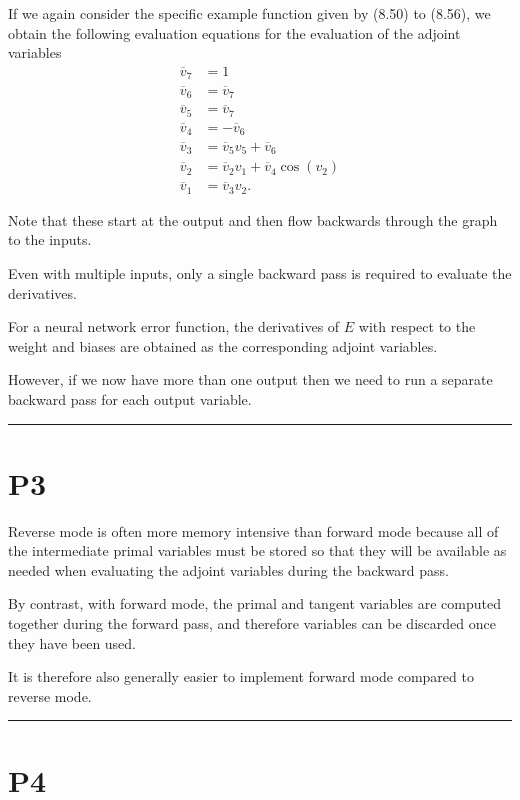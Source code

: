 \documentclass{article}
\begin{document}
If we again consider the specific example function given by (8.50) to (8.56), we obtain the following evaluation equations for the evaluation of the adjoint variables
\begin{align}
\overline{v}_7 &= 1 \tag{8.70} \\
\overline{v}_6 &= \overline{v}_7 \tag{8.71} \\
\overline{v}_5 &= \overline{v}_7 \tag{8.72} \\
\overline{v}_4 &= -\overline{v}_6 \tag{8.73} \\
\overline{v}_3 &= \overline{v}_5 v_5 + \overline{v}_6 \tag{8.74} \\
\overline{v}_2 &= \overline{v}_2 v_1 + \overline{v}_4 \cos(v_2) \tag{8.75} \\
\overline{v}_1 &= \overline{v}_3 v_2. 
\tag{8.76}
\end{align}

Note that these start at the output and then flow backwards through the graph to the inputs. 

Even with multiple inputs, only a single backward pass is required to evaluate the derivatives. 

For a neural network error function, the derivatives of $E$ with respect to the weight and biases are obtained as the corresponding adjoint variables. 

However, if we now have more than one output then we need to run a separate backward pass for each output variable.

\noindent\rule{\linewidth}{0.4pt}

\section{P3}

Reverse mode is often more memory intensive than forward mode because all of the intermediate primal variables must be stored so that they will be available as needed when evaluating the adjoint variables during the backward pass. 

By contrast, with forward mode, the primal and tangent variables are computed together during the forward pass, and therefore variables can be discarded once they have been used. 

It is therefore also generally easier to implement forward mode compared to reverse mode.

\noindent\rule{\linewidth}{0.4pt}

\section{P4}
\end{document}
